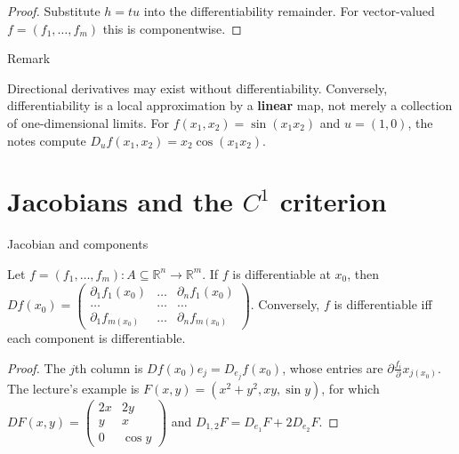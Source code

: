 \begin{proof}

Substitute \(h = tu\) into the differentiability remainder. For vector-valued \(f = \left( {f_{1},\ldots,f_{m}} \right)\) this is componentwise.

\end{proof}

\begin{qlremark}{Remark}

Directional derivatives may exist without differentiability. Conversely, differentiability is a local approximation by a \textbf{linear} map, not merely a collection of one-dimensional limits. For \(f\left( {x_{1},x_{2}} \right) = \sin\left( {x_{1}x_{2}} \right)\) and \(u = \left( {1,0} \right)\), the notes compute \(D_{u}f\left( {x_{1},x_{2}} \right) = x_{2}\cos\left( {x_{1}x_{2}} \right)\).

\end{qlremark}

\section{\texorpdfstring{Jacobians and the \(C^{1}\) criterion}{Jacobians and the C\^{}\{1\} criterion}}

\begin{theorem}{Jacobian and components}

Let \(f = \left( {f_{1},\ldots,f_{m}} \right):A \subseteq \mathbb{R}^{n}\rightarrow\mathbb{R}^{m}\). If \(f\) is differentiable at \(x_{0}\), then \(Df\left( x_{0} \right) = \begin{pmatrix}
{\partial_{1}f_{1}\left( x_{0} \right)} & \ldots & {\partial_{n}f_{1}\left( x_{0} \right)} \\
\ldots & \ldots & \ldots \\
{\partial_{1}f_{m{(x_{0})}}} & \ldots & {\partial_{n}f_{m{(x_{0})}}}
\end{pmatrix}\). Conversely, \(f\) is differentiable iff each component is differentiable.

\end{theorem}

\begin{proof}

The \(j\)th column is \(Df\left( x_{0} \right)e_{j} = D_{e_{j}}f\left( x_{0} \right)\), whose entries are \(\partial\frac{f_{i}}{\partial}x_{j{(x_{0})}}\). The lecture's example is \(F\left( {x,y} \right) = \left( {x^{2} + y^{2},xy,\sin y} \right)\), for which \(DF\left( {x,y} \right) = \begin{pmatrix}
{2x} & {2y} \\
y & x \\
0 & {\cos y}
\end{pmatrix}\) and \(D_{1,2}F = D_{e_{1}}F + 2D_{e_{2}}F\).

\end{proof}

